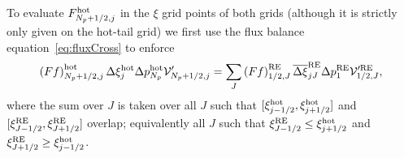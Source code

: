 \documentclass{notes}
\newcommand{\Vp}{\mathcal{V}'}
\begin{document}
    To evaluate $F^{\rm hot}_{N_p+1/2,j}$ in the $\xi$ grid points of both grids
    (although it is strictly only given on the hot-tail grid) we first use the
    flux balance equation~\eqref{eq:fluxCross} to enforce
    \begin{equation}\label{eq:fluxBalance2}
        \left( F f \right)^{\rm hot}_{N_p+1/2,j} \Delta\xi^{\rm hot}_j\Delta p_{N_p}^{\rm hot}\Vp_{N_p+1/2,j} =
        \sum_J \left( F f \right)^{\rm RE}_{1/2,J} \overline{\Delta\xi}^{\rm RE}_{jJ}\Delta p_1^{\rm RE} \Vp^{\rm RE}_{1/2,J},
    \end{equation}
    where the sum over $J$ is taken over all $J$ such that
    $[\xi_{j-1/2}^{\rm hot}, \xi_{j+1/2}^{\rm hot}]$ and $[\xi_{J-1/2}^{\rm RE},\xi_{J+1/2}^{\rm RE}]$
    overlap; equivalently all $J$ such that $\xi^{\rm RE}_{J-1/2}\leq\xi^{\rm hot}_{j+1/2}$
    and $\xi^{\rm RE}_{J+1/2}\geq\xi^{\rm hot}_{j-1/2}$.
\end{document}
